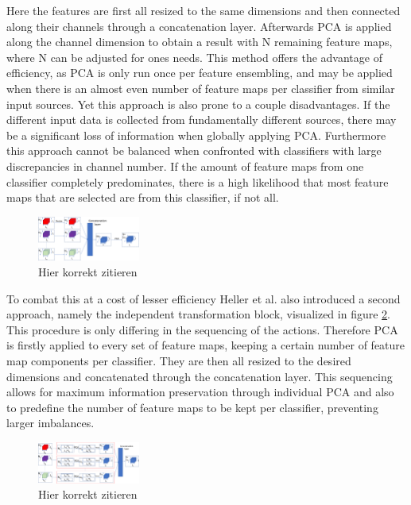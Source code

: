 Here the features are first all resized to the same dimensions and then connected along their channels through a concatenation layer.
Afterwards PCA is applied along the channel dimension to obtain a result with N remaining feature maps, where N can be adjusted for ones 
needs. This method offers the advantage of efficiency, as PCA is only run once per feature ensembling, and may be applied when there is 
an almost even number of feature maps per classifier from similar input sources. Yet this approach is also 
prone to a couple disadvantages. If the different input data is collected from fundamentally different sources, there may be a significant 
loss of information when globally applying PCA. Furthermore this approach cannot be balanced when confronted with classifiers with large 
discrepancies in channel number. If the amount of feature maps from one classifier completely predominates, there is a high likelihood 
that most feature maps that are selected are from this classifier, if not all.

\begin{figure}[ht]
    \centering
    \includegraphics[width=0.3\textwidth]{figures/global_transformation_block.jpg}
    \caption{Hier korrekt zitieren}
    \label{fig:GTBheller}
\end{figure}

To combat this at a cost of lesser efficiency Heller et al. also introduced a second approach, namely the independent transformation block, 
visualized in figure \ref{fig:ITBheller}. 
This procedure is only differing in the sequencing of the actions. Therefore PCA is firstly applied to every set of feature maps, keeping 
a certain number of feature map components per classifier. They are then all resized to the desired dimensions and concatenated through 
the concatenation layer. This sequencing allows for maximum information preservation through individual PCA and also to predefine the number 
of feature maps to be kept per classifier, preventing larger imbalances.

\begin{figure}[ht]
    \centering
    \includegraphics[width=0.3\textwidth]{figures/independent_transformation_block.jpg}
    \caption{Hier korrekt zitieren}
    \label{fig:ITBheller}
\end{figure}


